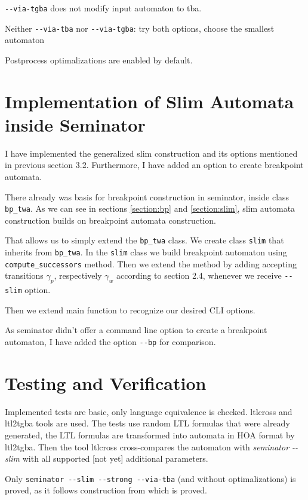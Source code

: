 \documentclass[
	digital
nolof, nolot
]{fithesis3}
\begin{document}
		\texttt{-{}-via-tgba} does not modify input automaton to tba.
		
		Neither \texttt{-{}-via-tba} nor \texttt{-{}-via-tgba}: try both options, choose the smallest automaton
		
		Postprocess optimalizations are enabled by default.
		
		
	\section{Implementation of Slim Automata inside Seminator}
	I have implemented the generalized slim construction and its options mentioned in previous section 3.2. Furthermore, I have added an option to create breakpoint automata.
	
	There already was basis for breakpoint construction in seminator, inside class \texttt{bp\_twa}.
	As we can see in sections \ref{section:bp} and \ref{section:slim}, slim automata construction builds on breakpoint automata construction.
	
	That allows us to simply extend the \texttt{bp\_twa} class.
	We create class \texttt{slim} that inherits from \texttt{bp\_twa}.
	In the \texttt{slim} class we build breakpoint automaton using \texttt{compute\_successors} method.
	Then we extend the method by adding accepting transitions $\gamma_p$, respectively $\gamma_w$ according to section 2.4, whenever we receive \texttt{-{}-slim} option.
	
	Then we extend main function to recognize our desired CLI options.
	
	As seminator didn't offer a command line option to create a breakpoint automaton, I have added the option \texttt{-{}-bp} for comparison.
	
	
	
	\section{Testing and Verification}
	Implemented tests are basic, only language equivalence is checked.
	ltlcross and ltl2tgba tools are used. The tests use random LTL formulas that were already generated, the LTL formulas are transformed into automata in HOA format by ltl2tgba.
	Then the tool ltlcross cross-compares the automaton with \emph{seminator -{}-slim} with all supported [not yet] additional parameters.
	
	Only \texttt{seminator -{}-slim -{}-strong -{}-via-tba} (and without optimalizations) is proved, as it follows construction from \cite{hlavni} which is proved.
	
\end{document}
